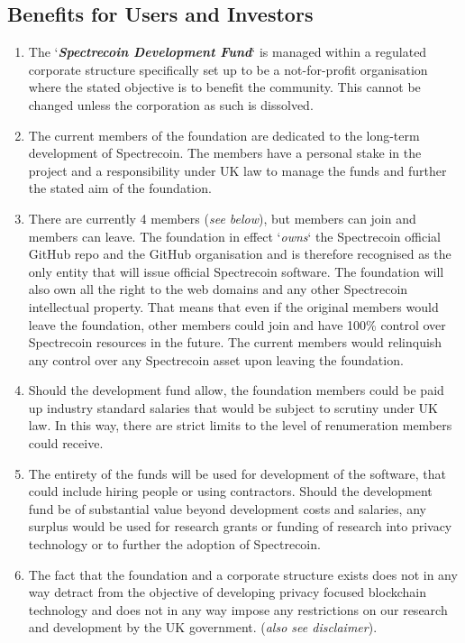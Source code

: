 \subsection{Benefits for Users and Investors}
\begin{enumerate}
	\item The ‘\textbf{\textit{Spectrecoin Development Fund}}‘ is managed
	within a regulated corporate structure specifically set up to be a
	not-for-profit organisation where the stated objective is to benefit
	the community. This cannot be changed unless the corporation as such
	is dissolved.
	\item The current members of the foundation are dedicated to the long-term
	development of Spectrecoin. The members have a personal stake in the
	project and a responsibility under UK law to manage the funds and further
	the stated aim of the foundation.
	\item There are currently 4 members (\textit{see below}), but members can
	join and members can leave. The foundation in effect ‘\textit{owns}‘ the
	Spectrecoin official GitHub repo and the GitHub organisation and is
	therefore recognised as the only entity that will issue official
	Spectrecoin software. The foundation will also own all the right to the
	web domains and any other Spectrecoin intellectual property. That means
	that even if the original members would leave the foundation, other
	members could join and have 100\% control over Spectrecoin resources in
	the future. The current members would relinquish any control over any
	Spectrecoin asset upon leaving the foundation.
	\item Should the development fund allow, the foundation members could be
	paid up industry standard salaries that would be subject to scrutiny
	under UK law. In this way, there are strict limits to the level of
	renumeration members could receive.
	\item The entirety of the funds will be used for development of the
	software, that could include hiring people or using contractors. Should
	the development fund be of substantial value beyond development costs
	and salaries, any surplus would be used for research grants or funding
	of research into privacy technology or to further the adoption of
	Spectrecoin.
	\item The fact that the foundation and a corporate structure exists
	does not in any way detract from the objective of developing privacy
	focused blockchain technology and does not in any way impose any
	restrictions on our research and development by the UK government.
	(\textit{also see disclaimer}).
\end{enumerate}



